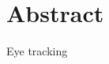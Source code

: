 \documentclass[UTF8]{report}
\begin{document}
	\chapter*{Abstract}  %
	
	Eye tracking
\end{document}
